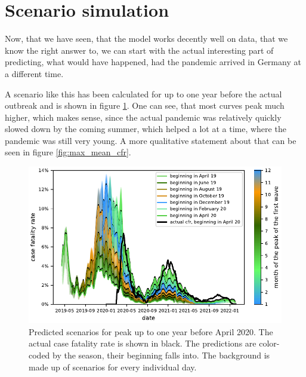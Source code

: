\documentclass{article}
\begin{document}

\section{Scenario simulation}

Now, that we have seen, that the model works decently well on data, that we know the right answer to, we can start with the actual interesting part of predicting, what would have happened, had the pandemic arrived in Germany at a different time. 

A scenario like this has been calculated for up to one year before the actual outbreak and is shown in figure \ref{fig:cfr_timeseries}. One can see, that most curves peak much higher, which makes sense, since the actual pandemic was relatively quickly slowed down by the coming summer, which helped a lot at a time, where the pandemic was still very young. A more qualitative statement about that can be seen in figure \ref{fig:max_mean_cfr}. 

\begin{figure}[hbt!]
  \begin{center}
    \includegraphics{../fig/CfrTimeseries.pdf}
    \caption{Predicted scenarios for peak up to one year before April 2020. The actual case fatality rate is shown in black. The predictions are color-coded by the season, their beginning falls into. The background is made up of scenarios for every individual day.}
    \label{fig:cfr_timeseries}
  \end{center}
\end{figure}
\end{document}
